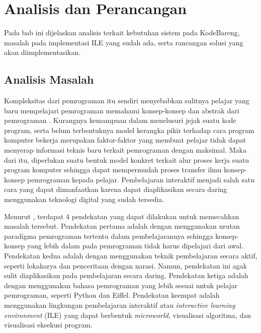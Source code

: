 \chapter{Analisis dan Perancangan}
Pada bab ini dijelaskan analisis terkait kebutuhan sistem pada KodeBareng, masalah pada implementasi ILE yang sudah ada, serta rancangan solusi yang akan diimplementasikan.

\section{Analisis Masalah}

Kompleksitas dari pemrograman itu sendiri menyebabkan sulitnya pelajar yang baru mempelajari pemrograman memahami konsep-konsep dan abstrak dari pemrograman \parencite{moons2013pilot}. Kurangnya kemampuan dalam menelusuri jejak suatu kode program, serta belum terbentuknya model kerangka pikir terhadap cara program komputer bekerja \parencite{mayer1981psychology} merupakan faktor-faktor yang membuat pelajar tidak dapat menyerap informasi teknis baru terkait pemrograman dengan maksimal. Maka dari itu, diperlukan suatu bentuk model konkret terkait alur proses kerja suatu program komputer sehingga dapat mempermudah proses transfer ilmu konsep-konsep pemrograman kepada pelajar. Pembelajaran interaktif menjadi salah satu cara yang dapat dimanfaatkan karena dapat diaplikasikan secara daring menggunakan teknologi digital yang sudah tersedia.

Menurut \textcite{moons2013pilot}, terdapat 4 pendekatan yang dapat dilakukan untuk memecahkan masalah tersebut. Pendekatan pertama adalah dengan menggunakan urutan paradigma pemrograman tertentu dalam pembelajarannya sehingga konsep-konsep yang lebih dalam pada pemrograman tidak harus dipelajari dari awal. Pendekatan kedua adalah dengan menggunakan teknik pembelajaran secara aktif, seperti lokakarya dan penceritaan dengan narasi. Namun, pendekatan ini agak sulit diaplikasikan pada pembelajaran secara daring. Pendekatan ketiga adalah dengan menggunakan bahasa pemrograman yang lebih sesuai untuk pelajar pemrograman, seperti Python dan Eiffel. Pendekatan keempat adalah menggunakan lingkungan pembelajaran interaktif atau \textit{interactive learning environment} (ILE) yang dapat berbentuk \textit{microworld}, visualisasi algoritma, dan visualisasi eksekusi program.


